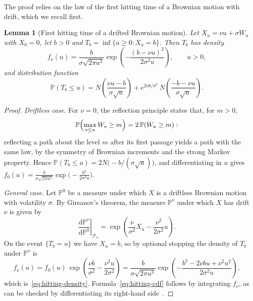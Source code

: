 \documentclass[11pt,a4paper]{article}
\newtheorem{lemma}{Lemma}
\theoremstyle{remark}
\begin{document}
The proof relies on the law of the first hitting time of a Brownian motion
with drift, which we recall first.

\begin{lemma}[First hitting time of a drifted Brownian motion]
\label{lem:hitting-time}
Let $X_u = \nu u + \sigma W_u$ with $X_0 = 0$, let $b > 0$ and
$T_b = \inf\{u \geq 0 : X_u = b\}$. Then $T_b$ has density
\begin{equation}
  f_{\nu}(u) = \frac{b}{\sigma\sqrt{2\pi u^3}}
  \exp\!\left(-\frac{(b - \nu u)^2}{2\sigma^2 u}\right), \qquad u > 0,
  \label{eq:hitting-density}
\end{equation}
and distribution function
\begin{equation}
  \mathbb{P}(T_b \leq u)
  = N\!\left(\frac{\nu u - b}{\sigma\sqrt{u}}\right)
  + e^{2\nu b/\sigma^2}\, N\!\left(\frac{-b - \nu u}{\sigma\sqrt{u}}\right).
  \label{eq:hitting-cdf}
\end{equation}
\end{lemma}

\begin{proof}
\emph{Driftless case.} For $\nu = 0$, the reflection principle states that,
for $m > 0$,
\begin{equation*}
  \mathbb{P}\Bigl(\max_{s \leq u} W_s \geq m\Bigr) = 2\,\mathbb{P}(W_u \geq m):
\end{equation*}
reflecting a path about the level $m$ after its first passage yields a path
with the same law, by the symmetry of Brownian increments and the strong
Markov property. Hence $\mathbb{P}(T_b \leq u) = 2N\bigl(-b/(\sigma\sqrt{u})\bigr)$,
and differentiating in $u$ gives
$f_0(u) = \frac{b}{\sigma\sqrt{2\pi u^3}}\exp\bigl(-\frac{b^2}{2\sigma^2 u}\bigr)$.

\emph{General case.} Let $\mathbb{P}^0$ be a measure under which $X$ is a
driftless Brownian motion with volatility $\sigma$. By Girsanov's theorem, the
measure $\mathbb{P}^{\nu}$ under which $X$ has drift $\nu$ is given by
\begin{equation*}
  \left.\frac{\mathrm{d}\mathbb{P}^{\nu}}{\mathrm{d}\mathbb{P}^{0}}\right|_{\mathcal{F}_u}
  = \exp\!\left(\frac{\nu}{\sigma^2}X_u - \frac{\nu^2}{2\sigma^2}u\right).
\end{equation*}
On the event $\{T_b = u\}$ we have $X_u = b$, so by optional stopping the
density of $T_b$ under $\mathbb{P}^{\nu}$ is
\begin{equation*}
  f_{\nu}(u) = f_0(u)\, \exp\!\left(\frac{\nu b}{\sigma^2} - \frac{\nu^2 u}{2\sigma^2}\right)
  = \frac{b}{\sigma\sqrt{2\pi u^3}}
    \exp\!\left(-\frac{b^2 - 2\nu b u + \nu^2 u^2}{2\sigma^2 u}\right),
\end{equation*}
which is~\eqref{eq:hitting-density}. Formula~\eqref{eq:hitting-cdf} follows by
integrating $f_{\nu}$, as can be checked by differentiating its right-hand
side~\cite{Shreve2004}.
\end{proof}
\end{document}
